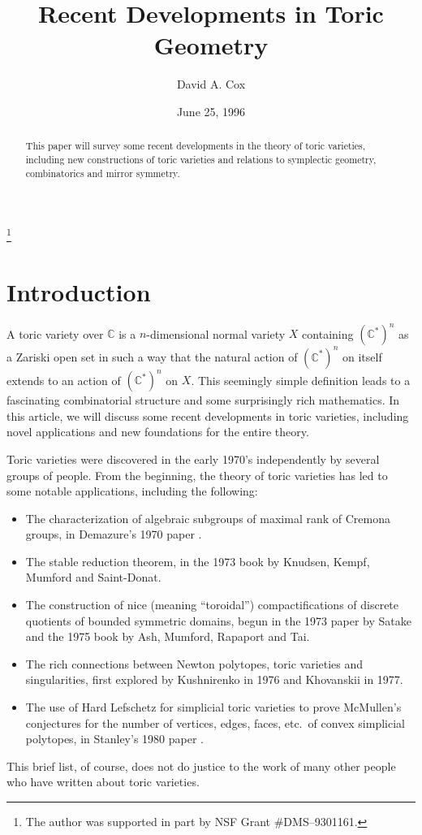 \documentclass{amsart}
\theoremstyle{plain}
\theoremstyle{definition}
\begin{document}
\title{Recent Developments in Toric Geometry}
\author{David A. Cox}
\address{Department of Mathematics and Computer Science, Amherst
College, Amherst, Massachusetts 01002}
\begin{abstract}
This paper will survey some recent developments in
the theory of toric varieties, including new constructions of toric
varieties and relations to symplectic geometry, combinatorics and
mirror symmetry.
\end{abstract}
\thanks{The author was supported in part by NSF Grant
\#DMS--9301161.}
\date{June 25, 1996}
\maketitle
\tableofcontents


\section*{Introduction}

	A toric variety over $\mathbb{C}$ is a $n$-dimensional normal
variety $X$ containing $(\mathbb{C}^*)^n$ as a Zariski open set in such
a way that the natural action of $(\mathbb{C}^*)^n$ on itself extends to
an action of $(\mathbb{C}^*)^n$ on $X$.  This seemingly simple
definition leads to a fascinating combinatorial structure and some
surprisingly rich mathematics.  In this article, we will discuss some
recent developments in toric varieties, including novel applications
and new foundations for the entire theory.

	Toric varieties were discovered in the early 1970's
independently by several groups of people.  From the beginning, the
theory of toric varieties has led to some notable applications,
including the following:
\begin{itemize}
\item The characterization of algebraic subgroups of
maximal rank of Cremona groups, in Demazure's 1970 paper \cite{Dem}.
\item The stable reduction theorem, in the 1973 book
\cite{KKMS} by Knudsen, Kempf, Mumford and Saint-Donat.
\item The construction of nice (meaning ``toroidal'')
compactifications of discrete quotients of bounded symmetric domains,
begun in the 1973 paper \cite{Sat} by Satake and the 1975 book
\cite{AMRT} by Ash, Mumford, Rapaport and Tai.
\item The rich connections between Newton polytopes,
toric varieties and singularities, first explored by Kushnirenko
\cite{Kus} in 1976 and Khovanskii \cite{Kho} in 1977.
\item The use of Hard Lefschetz for simplicial toric
varieties to prove McMullen's conjectures for the number of vertices, 
edges, faces, etc.~of convex simplicial polytopes, in Stanley's 1980
paper \cite{Sta}.
\end{itemize}
\noindent This brief list, of course, does not do justice to the work
of many other people who have written about toric varieties.
\end{document}
